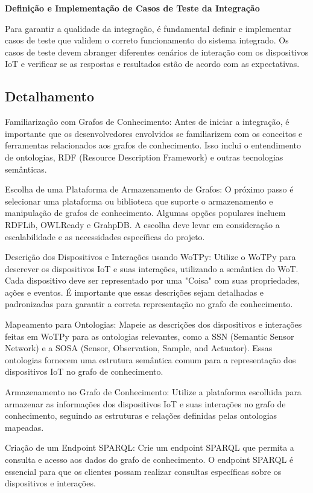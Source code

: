 \textbf{Definição e Implementação de Casos de Teste da Integração}

Para garantir a qualidade da integração, é fundamental definir e implementar casos de teste que validem o correto funcionamento do sistema integrado. Os casos de teste devem abranger diferentes cenários de interação com os dispositivos IoT e verificar se as respostas e resultados estão de acordo com as expectativas.

\subsection{Detalhamento}

Familiarização com Grafos de Conhecimento:
Antes de iniciar a integração, é importante que os desenvolvedores envolvidos se familiarizem com os conceitos e ferramentas relacionados aos grafos de conhecimento. Isso inclui o entendimento de ontologias, RDF (Resource Description Framework) e outras tecnologias semânticas.

Escolha de uma Plataforma de Armazenamento de Grafos:
O próximo passo é selecionar uma plataforma ou biblioteca que suporte o armazenamento e manipulação de grafos de conhecimento. Algumas opções populares incluem RDFLib, OWLReady e GrahpDB. A escolha deve levar em consideração a escalabilidade e as necessidades específicas do projeto.

Descrição dos Dispositivos e Interações usando WoTPy:
Utilize o WoTPy para descrever os dispositivos IoT e suas interações, utilizando a semântica do WoT. Cada dispositivo deve ser representado por uma "Coisa" com suas propriedades, ações e eventos. É importante que essas descrições sejam detalhadas e padronizadas para garantir a correta representação no grafo de conhecimento.

Mapeamento para Ontologias:
Mapeie as descrições dos dispositivos e interações feitas em WoTPy para as ontologias relevantes, como a SSN (Semantic Sensor Network) e a SOSA (Sensor, Observation, Sample, and Actuator). Essas ontologias fornecem uma estrutura semântica comum para a representação dos dispositivos IoT no grafo de conhecimento.

Armazenamento no Grafo de Conhecimento:
Utilize a plataforma escolhida para armazenar as informações dos dispositivos IoT e suas interações no grafo de conhecimento, seguindo as estruturas e relações definidas pelas ontologias mapeadas.

Criação de um Endpoint SPARQL:
Crie um endpoint SPARQL que permita a consulta e acesso aos dados do grafo de conhecimento. O endpoint SPARQL é essencial para que os clientes possam realizar consultas específicas sobre os dispositivos e interações.

